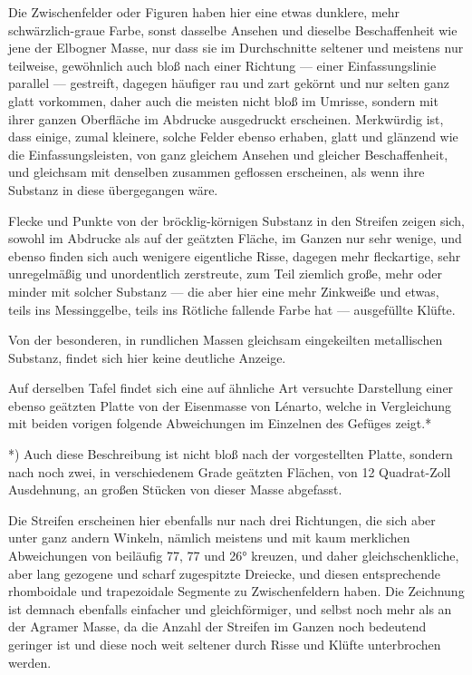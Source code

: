 \documentclass[a4paper, 11pt, oneside, german]{article}
\begin{document}
Die Zwischenfelder oder Figuren haben hier eine etwas dunklere, mehr schwärzlich-graue Farbe, sonst dasselbe Ansehen und dieselbe Beschaffenheit wie jene der Elbogner Masse, nur dass sie im Durchschnitte seltener und meistens nur teilweise, gewöhnlich auch bloß nach einer Richtung --- einer Einfassungslinie parallel --- gestreift, dagegen häufiger rau und zart gekörnt und nur selten ganz glatt vorkommen, daher auch die meisten nicht bloß im Umrisse, sondern mit ihrer ganzen Oberfläche im Abdrucke ausgedruckt erscheinen. Merkwürdig ist, dass einige, zumal kleinere, solche Felder ebenso erhaben, glatt und glänzend wie die Einfassungsleisten, von ganz gleichem Ansehen und gleicher Beschaffenheit, und gleichsam mit denselben zusammen geflossen erscheinen, als wenn ihre Substanz in diese übergegangen wäre.

Flecke und Punkte von der bröcklig-körnigen Substanz in den Streifen zeigen sich, sowohl im Abdrucke als auf der geätzten Fläche, im Ganzen nur sehr wenige, und ebenso finden sich auch wenigere eigentliche Risse, dagegen mehr fleckartige, sehr unregelmäßig und unordentlich zerstreute, zum Teil ziemlich große, mehr oder minder mit solcher Substanz --- die aber hier eine mehr Zinkweiße und etwas, teils ins Messinggelbe, teils ins Rötliche fallende Farbe hat --- ausgefüllte Klüfte.

Von der besonderen, in rundlichen Massen gleichsam eingekeilten metallischen Substanz, findet sich hier keine deutliche Anzeige.

Auf derselben Tafel findet sich eine auf ähnliche Art versuchte Darstellung einer ebenso geätzten Platte von der Eisenmasse von Lénarto, welche in Vergleichung mit beiden vorigen folgende Abweichungen im Einzelnen des Gefüges zeigt.*

*) Auch diese Beschreibung ist nicht bloß nach der vorgestellten Platte, sondern nach noch zwei, in verschiedenem Grade geätzten Flächen, von 12 Quadrat-Zoll Ausdehnung, an großen Stücken von dieser Masse abgefasst.

Die Streifen erscheinen hier ebenfalls nur nach drei Richtungen, die sich aber unter ganz andern Winkeln, nämlich meistens und mit kaum merklichen Abweichungen von beiläufig 77, 77 und 26° kreuzen, und daher gleichschenkliche, aber lang gezogene und scharf zugespitzte Dreiecke, und diesen entsprechende rhomboidale und trapezoidale Segmente zu Zwischenfeldern haben. Die Zeichnung ist demnach ebenfalls einfacher und gleichförmiger, und selbst noch mehr als an der Agramer Masse, da die Anzahl der Streifen im Ganzen noch bedeutend geringer ist und diese noch weit seltener durch Risse und Klüfte unterbrochen werden.
\end{document}
